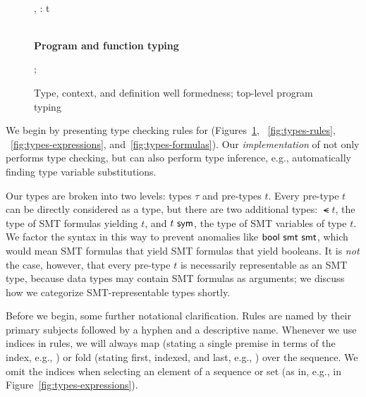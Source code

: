 \documentclass[acmsmall,screen,nonacm]{acmart}
\newcommand{\hdr}[2]{%
\flushleft
\textbf{#1} \hfill {#2} \\
\centering
}
\theoremstyle{definition}
\begin{document}
\begin{figure}[t]
  ~ \\[0.5em]

  {
     {\vdash \Phi, \uf: \rightarrow t}}
  
  ~ \\[0.5em]

  \hdr{Program and function typing}{
    \quad \fbox{$\Delta; \Phi \vdash \prog$}
  }

    {\Delta; \Phi \vdash {} ~ }


  \caption{Type, context, and definition well formedness; top-level program typing}
  \label{fig:types}
\end{figure}

We begin by presenting type checking rules for \Name
(Figures~\ref{fig:types}, ~\ref{fig:types-rules},
~\ref{fig:types-expressions}, and~\ref{fig:types-formulas}).
%
Our \emph{implementation} of \Name not only performs type checking,
but can also perform type inference, e.g., automatically finding type
variable substitutions.

Our types are broken into two levels: types $\tau$ and pre-types
$t$. Every pre-type $t$ can be directly considered as a type, but
there are two additional types: $\smt{t}$, the type of SMT formulas
yielding $t$, and ${t} ~ \mathsf{sym}$, the type of SMT variables of type $t$.
%
We factor the syntax in this way to prevent anomalies like
${{\mathsf{bool}} ~ \mathsf{smt}} ~ \mathsf{smt}$, which would mean SMT formulas that yield SMT
formulas that yield booleans.
%
It is \emph{not} the case, however, that every pre-type $t$ is
necessarily representable as an SMT type, because data types may
contain SMT formulas as arguments; we discuss how we categorize
SMT-representable types shortly.

Before we begin, some further notational clarification.
%
Rules are named by their primary subjects followed by a hyphen and a
descriptive name.
%
Whenever we use indices in rules, we will always map (stating a single
premise in terms of the index, e.g., ) or fold (stating
first, indexed, and last, e.g., ) over the
sequence. We omit the indices when selecting an element of a sequence
or set (as in, e.g.,  in
Figure~\ref{fig:types-expressions}).
\end{document}
